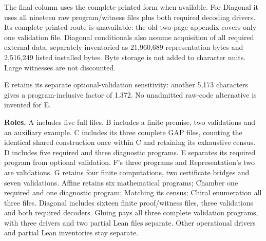 \documentclass[11pt,a4paper]{article}
\begin{document}
The final column uses the complete printed form when available. For Diagonal it uses all nineteen raw program/witness files plus both required decoding drivers. Its complete printed route is unavailable: the old two-page appendix covers only one validation file. Diagonal conditionals also assume acquisition of all required external data, separately inventoried as 21,960,689 representation bytes and 2,516,249 listed installed bytes. Byte storage is not added to character units. Large witnesses are not discounted.

E retains its separate optional-validation sensitivity: another 5,173 characters gives a program-inclusive factor of 1.372. No unadmitted raw-code alternative is invented for E.

\textbf{Roles.} A includes five full files. B includes a finite premise, two validations and an auxiliary example. C includes its three complete GAP files, counting the identical shared construction once within C and retaining its exhaustive census. D includes five required and three diagnostic programs. E separates its required program from optional validation. F's three programs and Representation's two are validations. G retains four finite computations, two certificate bridges and seven validations. Affine retains six mathematical programs; Chamber one required and one diagnostic program; Matching its census; Chiral enumeration all three files. Diagonal includes sixteen finite proof/witness files, three validations and both required decoders. Gluing pays all three complete validation programs, with three drivers and two partial Lean files separate. Other operational drivers and partial Lean inventories stay separate.
\end{document}
